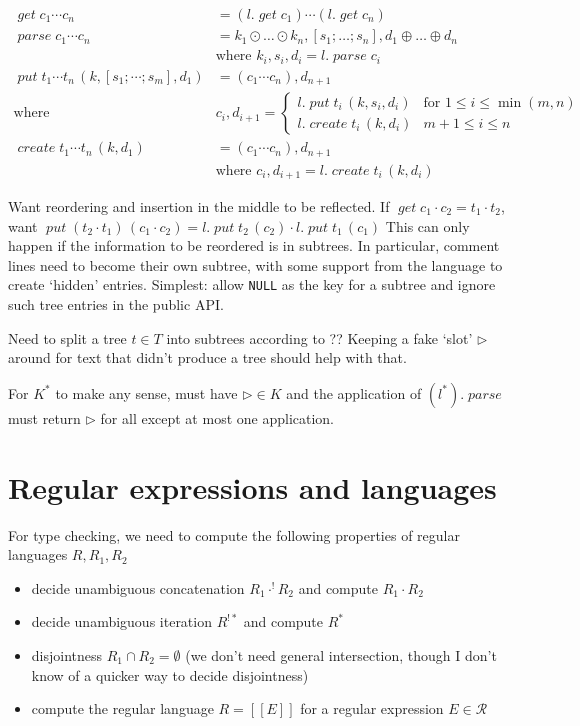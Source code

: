 \documentclass[12pt,fleqn]{amsart}
\newcommand{\ensmath}[1]{\ensuremath{#1}\xspace}
\newcommand{\opnam}[1]{\ensmath{\operatorname{\mathit{#1}}}}
\newcommand{\nparse}{\opnam{parse}}
\newcommand{\lget}[1]{\opnam{get}{#1}}
\newcommand{\lparse}[1]{\nparse{#1}}
\newcommand{\lput}[2]{\opnam{put}{#1}\,{(#2)}}
\newcommand{\lcreate}[2]{\opnam{create}{#1}\,{(#2)}}
\newcommand{\Regexp}{\ensmath{\mathcal R}}
\newcommand{\reglang}[1]{\ensmath{[\![{#1}]\!]}}
\newcommand{\conc}[2]{\ensmath{#1\cdot #2}}
\newcommand{\uaconc}[2]{\ensmath{#1\cdot^{!} #2}}
\newcommand{\uastar}[1]{\ensmath{#1^{!*}}}
\begin{document}
\begin{align*}
  \lget{c_1\cdots c_n} &= (l.\lget{c_1}) \cdots (l.\lget{c_n})\\
  \lparse{c_1\cdots c_n} &= k_1\odot\ldots\odot k_n, [s_1;\ldots;s_n],
                            d_1\oplus\ldots\oplus d_n\\
                            & \text{where } k_i,s_i,d_i = l.\lparse{c_i}\\
  \lput{t_1\cdots t_n}{k, [s_1;\cdots;s_m], d_1} &= (c_1 \cdots c_n), d_{n+1}\\
  \text{where } &c_i, d_{i+1} =
    \begin{cases}
      l.\lput{t_i}{k, s_i, d_i} & \text{for } 1 \leq i \leq \min(m,n)\\
      l.\lcreate{t_i}{k, d_i} & m+1 \leq i \leq n
    \end{cases}\\
  \lcreate{t_1 \cdots t_n}{k, d_1} &= (c_1\cdots c_n), d_{n+1}\\
  & \text{where } c_i, d_{i+1} = l.\lcreate{t_i}{k, d_i}
\end{align*}

Want reordering and insertion in the middle to be reflected. If
$\lget{\conc{c_1}{c_2}} = \conc{t_1}{t_2}$, want
$\lput{(\conc{t_2}{t_1})}{\conc{c_1}{c_2}} =
\conc{l.\lput{t_2}{c_2}}{l.\lput{t_1}{c_1}}$ This can only happen if the
information to be reordered is in subtrees. In particular, comment lines
need to become their own subtree, with some support from the language to
create `hidden' entries. Simplest: allow {\tt NULL} as the key for a
subtree and ignore such tree entries in the public API.

Need to split a tree $t\in T$ into subtrees according to ?? Keeping a fake
`slot' $\rhd$ around for text that didn't produce a tree should help with
that.

For $K^*$ to make any sense, must have $\rhd\in K$ and the application of
$(l^*).\nparse$ must return $\rhd$ for all except at most one application.

\section{Regular expressions and languages}

For type checking, we need to compute the following properties of regular
languages $R, R_1, R_2$
\begin{itemize}
\item decide unambiguous concatenation $\uaconc{R_1}{R_2}$ and compute
  $\conc{R_1}{R_2}$
\item decide unambiguous iteration $\uastar{R}$ and compute $R^*$
\item disjointness $R_1 \cap R_2 = \emptyset$ (we don't need general
  intersection, though I don't know of a quicker way to decide
  disjointness)
\item compute the regular language $R = \reglang{E}$ for a regular
  expression $E\in\Regexp$
\end{itemize}
\end{document}
